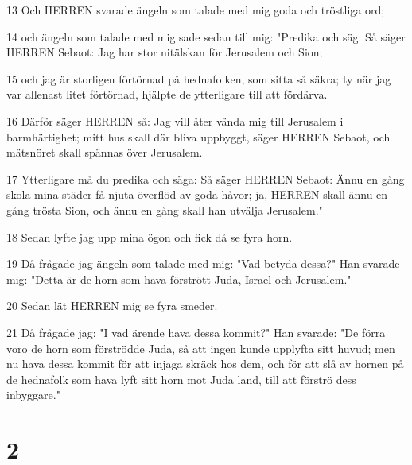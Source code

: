 \par 13 Och HERREN svarade ängeln som talade med mig goda och tröstliga ord;
\par 14 och ängeln som talade med mig sade sedan till mig: "Predika och säg: Så säger HERREN Sebaot: Jag har stor nitälskan för Jerusalem och Sion;
\par 15 och jag är storligen förtörnad på hednafolken, som sitta så säkra; ty när jag var allenast litet förtörnad, hjälpte de ytterligare till att fördärva.
\par 16 Därför säger HERREN så: Jag vill åter vända mig till Jerusalem i barmhärtighet; mitt hus skall där bliva uppbyggt, säger HERREN Sebaot, och mätsnöret skall spännas över Jerusalem.
\par 17 Ytterligare må du predika och säga: Så säger HERREN Sebaot: Ännu en gång skola mina städer få njuta överflöd av goda håvor; ja, HERREN skall ännu en gång trösta Sion, och ännu en gång skall han utvälja Jerusalem."
\par 18 Sedan lyfte jag upp mina ögon och fick då se fyra horn.
\par 19 Då frågade jag ängeln som talade med mig: "Vad betyda dessa?" Han svarade mig: "Detta är de horn som hava förstrött Juda, Israel och Jerusalem."
\par 20 Sedan lät HERREN mig se fyra smeder.
\par 21 Då frågade jag: "I vad ärende hava dessa kommit?" Han svarade: "De förra voro de horn som förströdde Juda, så att ingen kunde upplyfta sitt huvud; men nu hava dessa kommit för att injaga skräck hos dem, och för att slå av hornen på de hednafolk som hava lyft sitt horn mot Juda land, till att förströ dess inbyggare."

\chapter{2}

